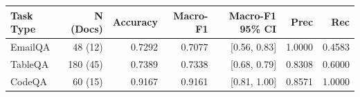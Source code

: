 \begin{tabular}{lrrrrrr}
\toprule
\textbf{Task Type} & \textbf{N (Docs)} & \textbf{Accuracy} & \textbf{Macro-F1} & \textbf{Macro-F1 95\% CI} & \textbf{Prec} & \textbf{Rec} \\
\midrule
EmailQA & 48 (12) & 0.7292 & 0.7077 & [0.56, 0.83] & 1.0000 & 0.4583 \\
TableQA & 180 (45) & 0.7389 & 0.7338 & [0.68, 0.79] & 0.8308 & 0.6000 \\
CodeQA & 60 (15) & 0.9167 & 0.9161 & [0.81, 1.00] & 0.8571 & 1.0000 \\
\bottomrule
\end{tabular}
